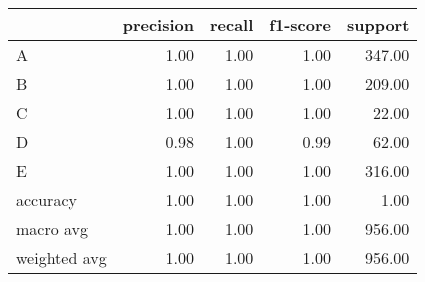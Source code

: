 \begin{tabular}{|l|r|r|r|r|}
\hline
{} &  precision &  recall &  f1-score &  support \\
\hline
A            &       1.00 &    1.00 &      1.00 &   347.00 \\
B            &       1.00 &    1.00 &      1.00 &   209.00 \\
C            &       1.00 &    1.00 &      1.00 &    22.00 \\
D            &       0.98 &    1.00 &      0.99 &    62.00 \\
E            &       1.00 &    1.00 &      1.00 &   316.00 \\
accuracy     &       1.00 &    1.00 &      1.00 &     1.00 \\
macro avg    &       1.00 &    1.00 &      1.00 &   956.00 \\
weighted avg &       1.00 &    1.00 &      1.00 &   956.00 \\
\hline
\end{tabular}
